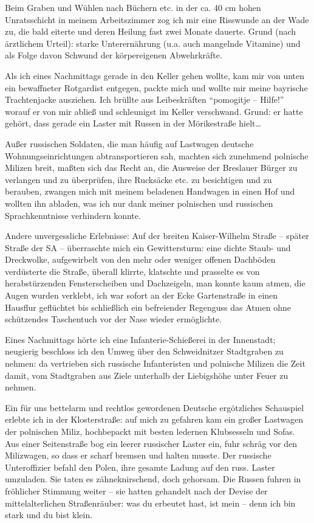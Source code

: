 Beim Graben und Wühlen nach Büchern etc. in der ca. 40 cm hohen Unratsschicht in meinem Arbeitszimmer zog ich mir eine Risswunde an der Wade zu, die bald eiterte und deren Heilung fast zwei Monate dauerte. Grund (nach ärztlichem Urteil): starke Unterernährung (u.a. auch mangelnde Vitamine) und als Folge davon Schwund der körpereigenen Abwehrkräfte.

Als ich eines Nachmittags gerade in den Keller gehen wollte, kam mir von unten ein bewaffneter Rotgardist entgegen, packte mich und wollte mir meine bayrische Trachtenjacke ausziehen. Ich brüllte aus Leibeskräften \enquote{pomogitje -- Hilfe!} worauf er von mir abließ und schleunigst im Keller verschwand. Grund: er hatte gehört, dass gerade ein Laster mit Russen in der Mörikestraße hielt\dots

Außer russischen Soldaten, die man häufig auf Lastwagen deutsche Wohnungseinrichtungen abtransportieren sah, machten sich zunehmend polnische Milizen breit, maßten sich das Recht an, die Ausweise der Breslauer Bürger zu verlangen und zu überprüfen, ihre Rucksäcke etc. zu besichtigen und zu berauben, zwangen mich mit meinem beladenen Handwagen in einen Hof und wollten ihn abladen, was ich nur dank meiner polnischen und russischen Sprachkenntnisse verhindern konnte.

Andere unvergessliche Erlebnisse: Auf der breiten Kaiser-Wilhelm Straße -- später Straße der SA --  überraschte mich ein Gewittersturm: eine dichte Staub- und Dreckwolke, aufgewirbelt von den mehr oder weniger offenen Dachböden verdüsterte die Straße, überall klirrte, klatschte und prasselte es von herabstürzenden Fensterscheiben und Dachzeigeln, man konnte kaum atmen, die Augen wurden verklebt, ich war sofort an der Ecke Gartenstraße in einen Hausflur geflüchtet bis schließlich ein befreiender Regenguss das Atmen ohne schützendes Taschentuch vor der Nase wieder ermöglichte.

Eines Nachmittags hörte ich eine Infanterie-Schießerei in der Innenstadt; neugierig beschloss ich den Umweg über den Schweidnitzer Stadtgraben zu nehmen: da vertrieben sich russische Infanteristen und polnische Milizen die Zeit damit, vom Stadtgraben aus Ziele unterhalb der Liebigshöhe unter Feuer zu nehmen.

Ein für uns bettelarm und rechtlos gewordenen Deutsche ergötzliches Schauspiel erlebte ich in der Klosterstraße: auf mich zu gefahren kam ein großer Lastwagen der polnischen Miliz, hochbepackt mit besten ledernen Klubsesseln und Sofas. Aus einer Seitenstraße bog ein leerer russischer Laster ein, fuhr schräg vor den Milizwagen, so dass er scharf bremsen und  halten musste. Der russische Unteroffizier befahl den Polen, ihre gesamte Ladung auf den russ. Laster umzuladen. Sie taten es zähneknirschend, doch gehorsam. Die Russen fuhren in fröhlicher Stimmung weiter -- sie hatten gehandelt nach der Devise der mittelalterlichen Straßenräuber: was du erbeutet hast, ist mein -- denn ich bin stark und du bist klein.

